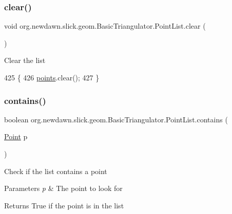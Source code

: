\subsubsection{\texorpdfstring{clear()}{clear()}}
{\footnotesize\ttfamily void org.\+newdawn.\+slick.\+geom.\+Basic\+Triangulator.\+Point\+List.\+clear (\begin{DoxyParamCaption}{ }\end{DoxyParamCaption})\hspace{0.3cm}{\ttfamily [inline]}}

Clear the list 
\begin{DoxyCode}
425                             \{
426             \mbox{\hyperlink{classorg_1_1newdawn_1_1slick_1_1geom_1_1_basic_triangulator_1_1_point_list_afc89fd9387b7c0663eda4f928e610b8a}{points}}.clear();
427         \}
\end{DoxyCode}
\mbox{\label{classorg_1_1newdawn_1_1slick_1_1geom_1_1_basic_triangulator_1_1_point_list_a13c2cbedb044688c7b46d2d4932fce51}} 
\subsubsection{\texorpdfstring{contains()}{contains()}}
{\footnotesize\ttfamily boolean org.\+newdawn.\+slick.\+geom.\+Basic\+Triangulator.\+Point\+List.\+contains (\begin{DoxyParamCaption}\item[{\mbox{\hyperlink{classorg_1_1newdawn_1_1slick_1_1geom_1_1_basic_triangulator_1_1_point}{Point}}}]{p }\end{DoxyParamCaption})\hspace{0.3cm}{\ttfamily [inline]}}

Check if the list contains a point


\begin{DoxyParams}{Parameters}
{\em p} & The point to look for \\
\hline
\end{DoxyParams}
\begin{DoxyReturn}{Returns}
True if the point is in the list 
\end{DoxyReturn}

